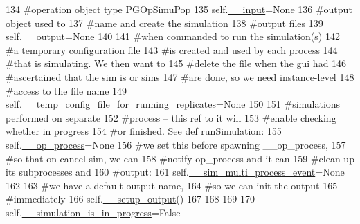 \begin{DoxyCode}
134         \textcolor{comment}{#operation object type PGOpSimuPop}
135         self.\hyperlink{classnegui_1_1pgguisimupop_1_1PGGuiSimuPop_a0b9f7d933b428393d34105828600a007}{\_\_input}=\textcolor{keywordtype}{None}
136         \textcolor{comment}{#output object used to}
137         \textcolor{comment}{#name and create the simulation}
138         \textcolor{comment}{#output files}
139         self.\hyperlink{classnegui_1_1pgguisimupop_1_1PGGuiSimuPop_a30f6eabf78230001520f90cb36de339f}{\_\_output}=\textcolor{keywordtype}{None}
140 
141         \textcolor{comment}{#when commanded to run the simulation(s)}
142         \textcolor{comment}{#a temporary configuration file}
143         \textcolor{comment}{#is created and used by each process}
144         \textcolor{comment}{#that is simulating.  We then want to}
145         \textcolor{comment}{#delete the file when the gui had }
146         \textcolor{comment}{#ascertained that the sim is or sims}
147         \textcolor{comment}{#are done, so we need instance-level}
148         \textcolor{comment}{#access to the file name}
149         self.\hyperlink{classnegui_1_1pgguisimupop_1_1PGGuiSimuPop_a60c4be477f462c6981a08c479c20a893}{\_\_temp\_config\_file\_for\_running\_replicates}=\textcolor{keywordtype}{None}
150 
151         \textcolor{comment}{#simulations performed on separate}
152         \textcolor{comment}{#process -- this ref to it will}
153         \textcolor{comment}{#enable checking whether in progress}
154         \textcolor{comment}{#or finished.  See def runSimulation:}
155         self.\hyperlink{classnegui_1_1pgguisimupop_1_1PGGuiSimuPop_acdcfde3516741c64806c6881f65c6f4e}{\_\_op\_process}=\textcolor{keywordtype}{None}
156         \textcolor{comment}{#we set this before spawning \_\_op\_process,}
157         \textcolor{comment}{#so that on cancel-sim, we can}
158         \textcolor{comment}{#notify op\_process and it can }
159         \textcolor{comment}{#clean up its subprocesses and }
160         \textcolor{comment}{#output:}
161         self.\hyperlink{classnegui_1_1pgguisimupop_1_1PGGuiSimuPop_a02ccc7da9aec67e8e13e083001aba15b}{\_\_sim\_multi\_process\_event}=\textcolor{keywordtype}{None}
162 
163         \textcolor{comment}{#we have a default output name,}
164         \textcolor{comment}{#so we can init the output}
165         \textcolor{comment}{#immediately}
166         self.\hyperlink{classnegui_1_1pgguisimupop_1_1PGGuiSimuPop_a23913431472d154054d66ab5e72daf0e}{\_\_setup\_output}()
167 
168 
169 
170         self.\hyperlink{classnegui_1_1pgguisimupop_1_1PGGuiSimuPop_a5064bac64c69bd13fe1366b21f1f7ad9}{\_\_simulation\_is\_in\_progress}=\textcolor{keyword}{False}

\end{DoxyCode}
